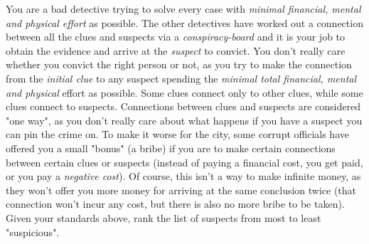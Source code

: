 

\par{You are a bad detective trying to solve every case with \textit{minimal financial, mental and physical effort} as possible. The other detectives have worked out a connection between all the clues and suspects via a \textit{conspiracy-board} and it is your job to obtain the evidence and arrive at the \textit{suspect} to convict. You don't really care whether you convict the right person or not, as you try to make the connection from the \textit{initial clue} to any suspect spending the \textit{minimal total financial, mental and physical} effort as possible. Some clues connect only to other clues, while some clues connect to suspects. Connections between clues and suspects are considered "one way", as you don't really care about what happens if you have a suspect you can pin the crime on. To make it worse for the city, some corrupt officials have offered you a small "bonus" (a bribe) if you are to make certain connections between certain clues or suspects (instead of paying a financial cost, you get paid, or you pay a \textit{negative cost}). Of course, this isn't a way to make infinite money, as they won't offer you more money for arriving at the same conclusion twice (that connection won't incur any cost, but there is also no more bribe to be taken). Given your standards above, rank the list of suspects from most to least "suspicious". }

